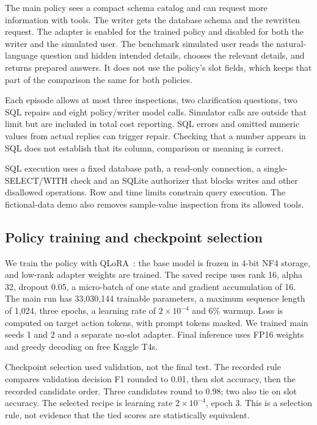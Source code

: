 \documentclass[11pt,a4paper]{article}
\begin{document}
The main policy sees a compact schema catalog and can request more information with tools. The writer
gets the database schema and the rewritten request. The adapter is enabled for the trained policy and
disabled for both the writer and the simulated user. The benchmark simulated user reads the natural-language
question and hidden intended details, chooses the relevant details, and returns prepared answers. It
does not use the policy's slot fields, which keeps that part of the comparison the same for both policies.

Each episode allows at most three inspections, two clarification questions, two SQL repairs and eight
policy/writer model calls. Simulator calls are outside that limit but are included in total cost reporting.
SQL errors and omitted numeric values from actual replies can trigger repair. Checking that a number
appears in SQL does not establish that its column, comparison or meaning is correct.

SQL execution uses a fixed database path, a read-only connection, a single-SELECT/WITH check and an
SQLite authorizer that blocks writes and other disallowed operations. Row and time limits constrain
query execution. The fictional-data demo also removes sample-value inspection from its allowed tools.

\subsection{Policy training and checkpoint selection}

We train the policy with QLoRA~\cite{qlora}: the base model is frozen in 4-bit NF4 storage, and low-rank
adapter weights are trained. The saved recipe uses rank 16, alpha 32, dropout 0.05, a micro-batch of one
state and gradient accumulation of 16. The main run has 33,030,144 trainable parameters, a maximum
sequence length of 1,024, three epochs, a learning rate of $2\times10^{-4}$ and 6\% warmup. Loss is
computed on target action tokens, with prompt tokens masked. We trained main seeds 1 and 2 and a
separate no-slot adapter. Final inference uses FP16 weights and greedy decoding on free Kaggle T4s.

Checkpoint selection used validation, not the final test. The recorded rule compares validation decision
F1 rounded to 0.01, then slot accuracy, then the recorded candidate order. Three candidates round to
0.98; two also tie on slot accuracy. The selected recipe is learning rate $2\times10^{-4}$, epoch 3.
This is a selection rule, not evidence that the tied scores are statistically equivalent.
\end{document}
